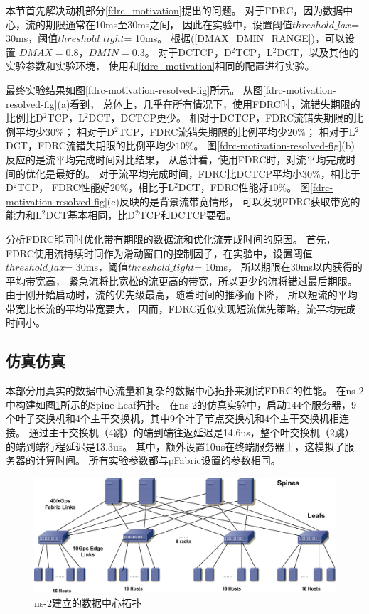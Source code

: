 本节首先解决动机部分\ref{fdrc_motivation}提出的问题。
对于FDRC，因为数据中心，流的期限通常在10ms至30ms之间，
因此在实验中，设置阈值$threshold\_lax$= 30ms，阈值$threshold\_tight$= 10ms。 
根据(\ref{DMAX_DMIN_RANGE})，可以设置 $DMAX = 0.8$，$DMIN = 0.3$。
对于DCTCP，D$^2$TCP，L$^2$DCT，以及其他的实验参数和实验环境，
使用和\ref{fdrc_motivation}相同的配置进行实验。


最终实验结果如图\ref{fdrc-motivation-resolved-fig}所示。
从图\ref{fdrc-motivation-resolved-fig}(a)看到，
总体上，几乎在所有情况下，使用FDRC时，流错失期限的比例比D$^2$TCP，L$^2$DCT，DCTCP更少。
相对于DCTCP，FDRC流错失期限的比例平均少$30\%$；
相对于D$^2$TCP，FDRC流错失期限的比例平均少$20\%$；
相对于L$^2$DCT，FDRC流错失期限的比例平均少$10\%$。
图\ref{fdrc-motivation-resolved-fig}(b)反应的是流平均完成时间对比结果，
从总计看，使用FDRC时，对流平均完成时间的优化是最好的。
对于流平均完成时间，FDRC比DCTCP平均小$30\%$，相比于D$^2$TCP，
FDRC性能好$20\%$，相比于L$^2$DCT，FDRC性能好$10\%$。
图\ref{fdrc-motivation-resolved-fig}(c)反映的是背景流带宽情形，
可以发现FDRC获取带宽的能力和L$^2$DCT基本相同，比D$^2$TCP和DCTCP要强。

分析FDRC能同时优化带有期限的数据流和优化流完成时间的原因。
首先，FDRC使用流持续时间作为滑动窗口的控制因子，在实验中，设置阈值$threshold\_lax$= 30ms，阈值$threshold\_tight$= 10ms，
所以期限在30ms以内获得的平均带宽高，
紧急流将比宽松的流更高的带宽，所以更少的流将错过最后期限。
由于刚开始启动时，流的优先级最高，随着时间的推移而下降，
所以短流的平均带宽比长流的平均带宽要大，
因而，FDRC近似实现短流优先策略，流平均完成时间小。

\subsection{仿真仿真}

本部分用真实的数据中心流量和复杂的数据中心拓扑来测试FDRC的性能。
在ns-2中构建如图\ref{FDRC-DataCenterTop-fig}所示的Spine-Leaf拓扑。
在ns-2的仿真实验中，启动144个服务器，9个叶子交换机和4个主干交换机，其中9个叶子节点交换机和4个主干交换机相连接。
通过主干交换机（4跳）的端到端往返延迟是14.6us，整个叶交换机（2跳）的端到端行程延迟是13.3us。
其中，额外设置10us在终端服务器上，这模拟了服务器的计算时间。
所有实验参数都与pFabric\cite{pFabric}设置的参数相同。


\begin{figure}[H] 
  \centering
  \includegraphics[width=0.8\columnwidth]{figures/FDRC/evaluation/spineleaf/spineleaf.eps}
  \caption{ns-2建立的数据中心拓扑}
\label{FDRC-DataCenterTop-fig}
\end{figure}

